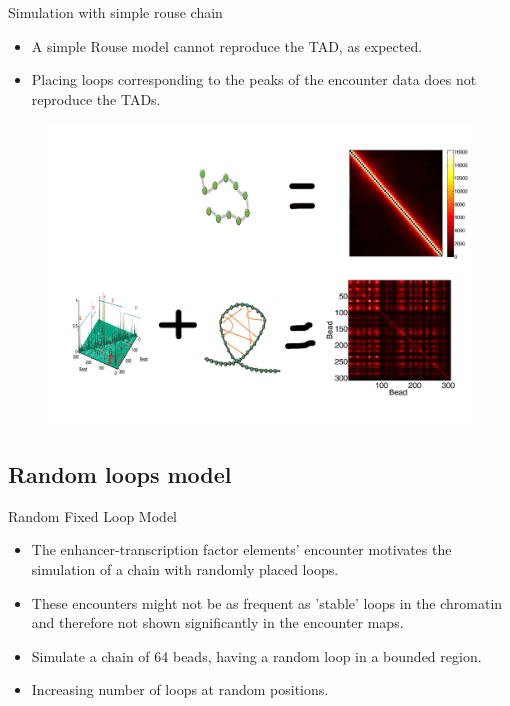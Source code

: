 \documentclass[8pt]{beamer}
\begin{document}
\begin{frame}{Simulation with simple rouse chain}
\begin{itemize}
\item A simple Rouse model cannot reproduce the TAD, as expected.
\item Placing loops corresponding to the peaks of the encounter data does not reproduce the TADs. 
\end{itemize}
\begin{figure}[H]
\includegraphics[scale=0.4]{simulationWithSimpleRouseExperimentalData}
\end{figure}
\end{frame}

\subsection{Random loops model}\label{subsection_randomLoopsModel}

\begin{frame}{Random Fixed Loop Model}
\begin{itemize}
\item The enhancer-transcription factor elements' encounter motivates the simulation of a chain with randomly placed loops.
\item These encounters might not be as frequent as 'stable' loops in the chromatin and therefore not shown significantly in the encounter maps.
\item Simulate a chain of 64 beads, having a random loop in a bounded region.
\item Increasing number of loops at random positions. 
\end{itemize}

\end{frame}
\end{document}
